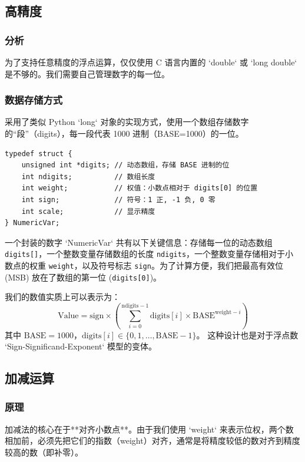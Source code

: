 \documentclass[UTF8]{ctexart}
\begin{document}
\subsection{高精度}
\subsubsection{分析}
为了支持任意精度的浮点运算，仅仅使用 C 语言内置的 `double` 或 `long double` 是不够的。我们需要自己管理数字的每一位。

\subsubsection{数据存储方式}
采用了类似 Python `long` 对象的实现方式，使用一个数组存储数字的“段”（digits），每一段代表 1000 进制（BASE=1000）的一位。
\begin{lstlisting}
typedef struct { 
    unsigned int *digits; // 动态数组，存储 BASE 进制的位
    int ndigits;          // 数组长度
    int weight;           // 权值：小数点相对于 digits[0] 的位置
    int sign;             // 符号：1 正, -1 负, 0 零
    int scale;            // 显示精度
} NumericVar;
\end{lstlisting}

一个封装的数字 `NumericVar` 共有以下关键信息：存储每一位的动态数组 \texttt{digits[]}，一个整数变量存储数组的长度 \texttt{ndigits}，一个整数变量存储相对于小数点的权重 \texttt{weight}，以及符号标志 \texttt{sign}。为了计算方便，我们把最高有效位 (MSB) 放在了数组的第一位 (\texttt{digits[0]})。

我们的数值实质上可以表示为：
\[
\text{Value} = \text{sign} \times \left( \sum_{i=0}^{\text{ndigits}-1} \text{digits}[i] \times \text{BASE}^{\text{weight}-i} \right)
\]
其中 \(\text{BASE} = 1000\)，\(\text{digits}[i] \in \{0, 1, \dots, \text{BASE}-1\}\)。
这种设计也是对于浮点数 `Sign-Significand-Exponent` 模型的变体。

\subsection{加减运算}
\subsubsection{原理}
加减法的核心在于**对齐小数点**。由于我们使用 `weight` 来表示位权，两个数相加前，必须先把它们的指数（weight）对齐，通常是将精度较低的数对齐到精度较高的数（即补零）。
\end{document}
